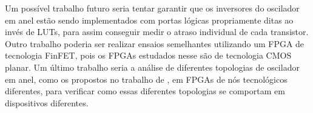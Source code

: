 Um possível trabalho futuro seria tentar garantir que os inversores do oscilador em anel estão sendo implementados com portas lógicas propriamente ditas ao invés de LUTs, para assim conseguir medir o atraso individual de cada transistor. Outro trabalho poderia ser realizar ensaios semelhantes utilizando um FPGA de tecnologia FinFET, pois os FPGAs estudados nesse são de tecnologia CMOS planar. Um último trabalho seria a análise de diferentes topologias de oscilador em anel, como os propostos no trabalho de \cite{Sato}, em FPGAs de nós tecnológicos diferentes, para verificar como essas diferentes topologias se comportam em dispositivos diferentes.













